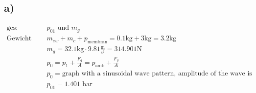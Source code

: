 

\subsection*{a)}
\begin{align*}
    \text{ges: } & p_{01} \text{ und } m_g \\
    \text{Gewicht auf Gas lastend: } & m_{ew} + m_c + p_{\text{membran}} = 0.1 \text{kg} + 3 \text{kg} = 3.2 \text{kg} \\
    & m_g = 32.1 \text{kg} \cdot 9.81 \frac{\text{m}}{\text{s}^2} = 314.901 \text{N} \\
    & p_0 = p_1 + \frac{F_g}{A} = p_{\text{amb}} + \frac{F_g}{A} \\
    & p_0 = \text{graph with a sinusoidal wave pattern, amplitude of the wave is approximately 0.05 m, and the wave is centered around 314.901 N. The x-axis is labeled in meters (m) and the y-axis in Newtons (N).} \\
    & p_{01} = 1.401 \text{ bar}
\end{align*}